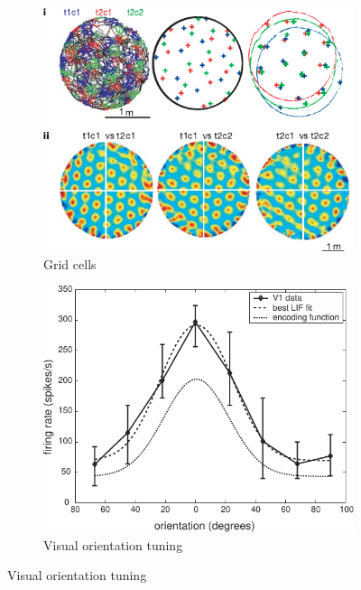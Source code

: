\documentclass[10pt,letterpaper,oneside]{article}
\begin{document}
\begin{figure}[t]%
	\begin{subfigure}[b]{0.5\columnwidth}%
		\includegraphics[width=\columnwidth]{media/hafting_et_al_2005_grid_cells.pdf}%
		\caption{Grid cells}%
		\label{fig:hafting_et_al_2005_grid_cells}%
	\end{subfigure}%
	\begin{subfigure}[b]{0.5\columnwidth}%
		\includegraphics[width=\columnwidth]{media/eliasmith_et_al_2003_orientation_tuning.pdf}%
		\caption{Visual orientation tuning}%
		\label{fig:eliasmith_et_al_2003_orientation_tuning}%
	\end{subfigure}%

\end{figure}
\end{document}
